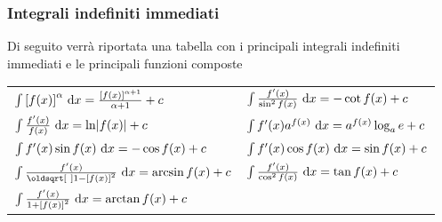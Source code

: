 \subsubsection{Integrali indefiniti immediati}
Di seguito verrà riportata una tabella con i principali integrali indefiniti immediati e le 
principali funzioni composte
\tablefirsthead{\midrule}
\tablehead{\midrule}
\tablelasttail{\bottomrule}
\renewcommand*{\arraystretch}{3.3}
\begin{center}
  \begin{xtabular}{M{4cm}|M{4cm}}
    $\int {[f(x)]}^\alpha\,\mathop{}\!\mathrm{d} x = \frac{{[f(x)]}^{\alpha+1}}{\alpha+1}+c$ & 
      $\int\frac{f'(x)}{\sin^2 f(x)}\,\mathop{}\!\mathrm{d} x = -\cot f(x) +c$\\ 
    $\int \frac{f'(x)}{f(x)}\,\mathop{}\!\mathrm{d} x = \ln\lvert f(x)\rvert+c$ &
      $\int f'(x)a^{f(x)}\,\mathop{}\!\mathrm{d} x = a^{f(x)}\log_a e + c$\\ 
    $\int f'(x)\sin f(x)\,\mathop{}\!\mathrm{d} x = -\cos f(x)+c$ &
      $\int f'(x)\cos f(x)\,\mathop{}\!\mathrm{d} x = \sin f(x) + c$\\ 
    $\int \frac{f'(x)}{\sqrt{1-{[f(x)]}^2}}\,\dif x = \arcsin f(x) + c$ &
      $\int \frac{f'(x)}{\cos^2 f(x)}\,\mathop{}\!\mathrm{d} x = \tan f(x) + c$\\ 
    $\int \frac{f'(x)}{1+{[f(x)]}^2}\,\mathop{}\!\mathrm{d} x = \arctan f(x) + c$ & \\ 
  \end{xtabular}
\end{center}
\renewcommand*{\arraystretch}{2.4}

